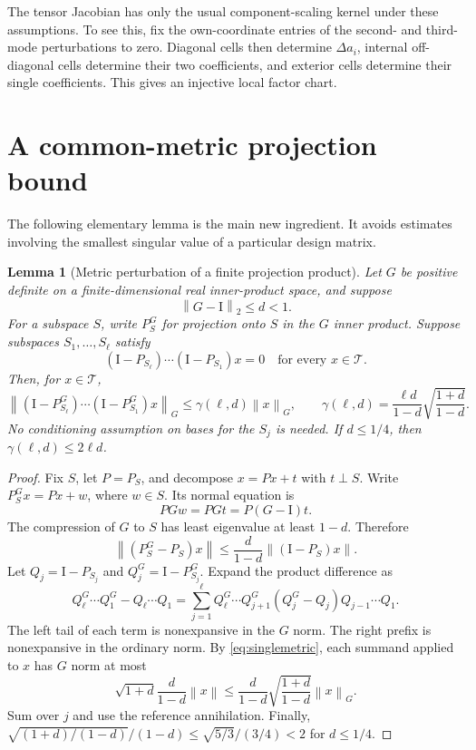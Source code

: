 \documentclass[11pt]{article}
\newtheorem{lemma}[theorem]{Lemma}
\theoremstyle{remark}\newtheorem{remark}[theorem]{Remark}
\newcommand{\norm}[1]{\left\lVert#1\right\rVert}
\newcommand{\Id}{\mathrm I}
\begin{document}
The tensor Jacobian has only the usual component-scaling kernel under these assumptions. To see this, fix the own-coordinate entries of the second- and third-mode perturbations to zero. Diagonal cells then determine $\Delta a_i$, internal off-diagonal cells determine their two coefficients, and exterior cells determine their single coefficients. This gives an injective local factor chart.

\section{A common-metric projection bound}
The following elementary lemma is the main new ingredient. It avoids estimates involving the smallest singular value of a particular design matrix.

\begin{lemma}[Metric perturbation of a finite projection product]\label{lem:metric}
Let $G$ be positive definite on a finite-dimensional real inner-product space, and suppose
\[
 \norm{G-\Id}_2\le d<1.
\]
For a subspace $S$, write $P_S^G$ for projection onto $S$ in the $G$ inner product. Suppose subspaces $S_1,\ldots,S_\ell$ satisfy
\[
 (\Id-P_{S_\ell})\cdots(\Id-P_{S_1})x=0
 \quad\text{for every }x\in\mathcal T.
\]
Then, for $x\in\mathcal T$,
\begin{equation}\label{eq:metricbound}
 \norm{(\Id-P_{S_\ell}^G)\cdots(\Id-P_{S_1}^G)x}_G
 \le \gamma(\ell,d)\norm{x}_G,
 \qquad
 \gamma(\ell,d)=\frac{\ell d}{1-d}\sqrt{\frac{1+d}{1-d}}.
\end{equation}
No conditioning assumption on bases for the $S_j$ is needed. If $d\le1/4$, then $\gamma(\ell,d)\le2\ell d$.
\end{lemma}
\begin{proof}
Fix $S$, let $P=P_S$, and decompose $x=Px+t$ with $t\perp S$. Write $P_S^Gx=Px+w$, where $w\in S$. Its normal equation is
\[
 PGw=PGt=P(G-\Id)t.
\]
The compression of $G$ to $S$ has least eigenvalue at least $1-d$. Therefore
\begin{equation}\label{eq:singlemetric}
 \norm{(P_S^G-P_S)x}
 \le\frac{d}{1-d}\norm{(\Id-P_S)x}.
\end{equation}
Let $Q_j=\Id-P_{S_j}$ and $Q_j^G=\Id-P_{S_j}^G$. Expand the product difference as
\[
 Q_\ell^G\cdots Q_1^G-Q_\ell\cdots Q_1
 =\sum_{j=1}^{\ell}Q_\ell^G\cdots Q_{j+1}^G
      (Q_j^G-Q_j)Q_{j-1}\cdots Q_1.
\]
The left tail of each term is nonexpansive in the $G$ norm. The right prefix is nonexpansive in the ordinary norm. By \eqref{eq:singlemetric}, each summand applied to $x$ has $G$ norm at most
\[
 \sqrt{1+d}\frac{d}{1-d}\norm{x}
 \le \frac{d}{1-d}\sqrt{\frac{1+d}{1-d}}\norm{x}_G.
\]
Sum over $j$ and use the reference annihilation. Finally,
$\sqrt{(1+d)/(1-d)}/(1-d)\le\sqrt{5/3}/(3/4)<2$ for $d\le1/4$.
\end{proof}
\end{document}
